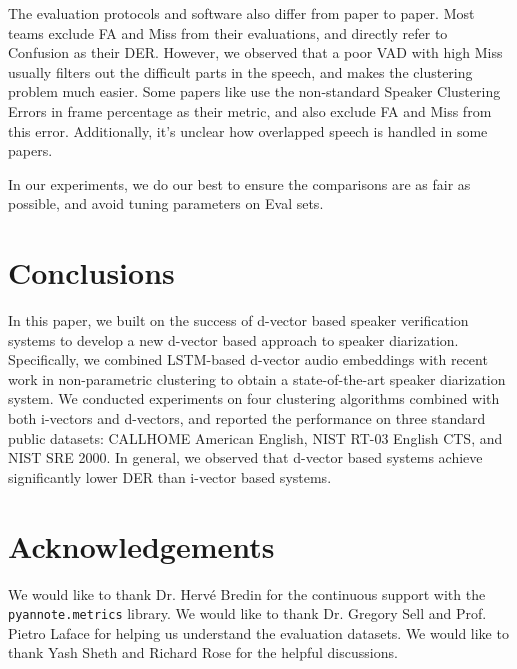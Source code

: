 \documentclass{article}
\begin{document}
The evaluation protocols and software also differ from
paper to paper. Most teams exclude FA and Miss from their evaluations,
and directly refer to Confusion as their DER.
However, we observed that a poor VAD with high Miss usually filters out
the difficult parts in the speech, and makes the clustering problem much easier.
Some papers like \cite{dimitriadis2017developing} use the non-standard
Speaker Clustering Errors in frame percentage
as their metric, and also exclude FA and Miss from this error.
Additionally, it's unclear how overlapped speech is handled in some papers.

In our experiments, we do our best to ensure the comparisons are as fair as possible, and
avoid tuning parameters on Eval sets.

\section{Conclusions}
\label{sec:conclusions}


In this paper, we built on the success of d-vector based speaker verification systems to develop a new d-vector based approach to speaker diarization. Specifically, we combined LSTM-based d-vector audio embeddings with recent work in non-parametric clustering to obtain a state-of-the-art speaker diarization system. We conducted experiments on four clustering algorithms combined with both
i-vectors and d-vectors, and reported the performance on three standard public datasets: CALLHOME American English, NIST RT-03 English CTS, and NIST SRE 2000.
In general, we observed that
d-vector based systems achieve significantly lower DER than i-vector based systems.



\section{Acknowledgements}
\label{sec:ack}

We would like to thank Dr. Herv\'{e} Bredin for the continuous support with the
\texttt{pyannote.metrics} library. We would like to thank Dr. Gregory Sell and Prof. Pietro Laface for helping us
understand the evaluation datasets.
We would like to thank Yash Sheth and Richard Rose for the helpful discussions.

\newpage


\end{document}
